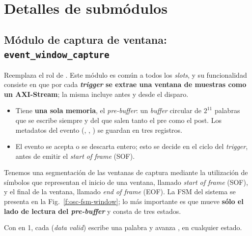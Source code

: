 \section{Detalles de submódulos}
\label{S:osc-submodulos}

\subsection{Módulo de captura de ventana:
\texorpdfstring{\texttt{event\_window\_capture}}{event\_window\_capture}}
\label{S:osc-window-capture}

Reemplaza el rol de . Este módulo es común a todos los
\emph{slots}, y su funcionalidad consiste en que por cada \textbf{\emph{trigger} se extrae una
ventana de muestras como un AXI-Stream}; la misma incluye  antes y
 desde el disparo.
\begin{itemize}
  \item Tiene \textbf{una sola memoria}, el \emph{pre-buffer}: un \emph{buffer} circular de
    $2^{11}$ palabras que se escribe siempre y del que salen tanto el pre como
    el post. Los metadatos del evento (, ,
    ) se guardan en tres registros.
  \item El evento se acepta o se descarta entero; esto se decide en el ciclo del
    \emph{trigger}, antes de emitir el \emph{start of frame} (SOF).
\end{itemize}

Tenemos una segmentación de las ventanas de captura mediante la utilización de
símbolos que representan el inicio de una ventana, llamado \emph{start of frame}
(SOF), y el final de la ventana, llamado \emph{end of frame} (EOF). La FSM del
sistema se presenta en la Fig.~\ref{f:osc-fsm-window}; lo más importante es que
mueve \textbf{sólo el lado de lectura del \emph{pre-buffer}} y consta de tres estados.

Con  en 1, cada  (\emph{data valid}) escribe una palabra y
avanza , en cualquier estado.

